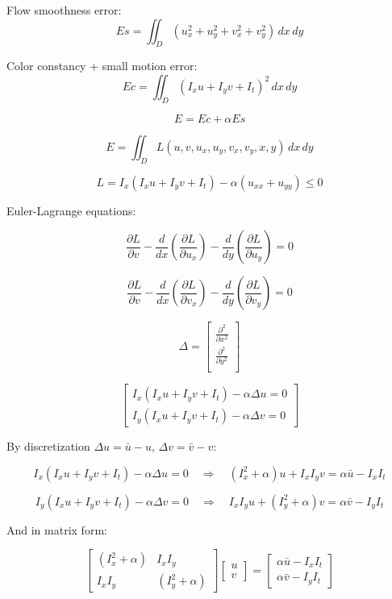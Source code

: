 \documentclass{article}
\begin{document}
\begin{multicols}{2}
	\noindent Flow smoothness error:
	\[ Es = \iint_D (u_{x}^2 + u_{y}^2 + v_{x}^2 + v_{y}^2) \, dx \, dy \]

	\noindent Color constancy + small motion error:
	\[ Ec = \iint_D (I_{x}u + I_{y}v + I_{t})^2 \, dx \, dy \]

	\[ E = Ec + \alpha Es \]

	\[ E = \iint_D L(u, v, u_x, u_y, v_x, v_y, x, y) \, dx \, dy \]

	\[ L = I_x (I_{x}u + I_{y}v + I_{t}) - \alpha (u_{xx} + u_{yy}) \leq 0 \]

    Euler-Lagrange equations:

	\[ \frac{\partial L}{\partial v} - \frac{d}{dx} \left( \frac{\partial L}{\partial u_{x}} \right) - \frac{d}{dy} \left( \frac{\partial L}{\partial u_{y}} \right) = 0 \]

	\[ \frac{\partial L}{\partial v} - \frac{d}{dx} \left( \frac{\partial L}{\partial v_{x}} \right) - \frac{d}{dy} \left( \frac{\partial L}{\partial v_{y}} \right) = 0 \]


	\[ \Delta =
		\begin{bmatrix}
			\frac{\partial^2}{\partial x^2} \\
			\frac{\partial^2}{\partial y^2} \\
		\end{bmatrix} \]

	\[ \begin{bmatrix}
			I_x (I_{x}u + I_{y}v + I_{t}) - \alpha \Delta u = 0 \\
			I_y (I_{x}u + I_{y}v + I_{t}) - \alpha \Delta v = 0
		\end{bmatrix} \]

	By discretization \(\Delta u = \bar{u} - u\), \(\Delta v = \bar{v} - v\):

	\[
		I_x (I_x u + I_y v + I_t) - \alpha \Delta u = 0 \quad \Rightarrow \quad (I_x^2 + \alpha)u + I_x I_y v = \alpha \bar{u} - I_x I_t
	\]

	\[
		I_y (I_x u + I_y v + I_t) - \alpha \Delta v = 0 \quad \Rightarrow \quad I_x I_y u + (I_y^2 + \alpha)v = \alpha \bar{v} - I_y I_t
	\]

	And in matrix form:

	\[
		\begin{bmatrix}
			(I_x^2 + \alpha) & I_x I_y          \\
			I_x I_y          & (I_y^2 + \alpha)
		\end{bmatrix}
		\begin{bmatrix}
			u \\
			v
		\end{bmatrix}
		=
		\begin{bmatrix}
			\alpha \bar{u} - I_x I_t \\
			\alpha \bar{v} - I_y I_t
		\end{bmatrix}
	\]


\end{multicols}
\end{document}
